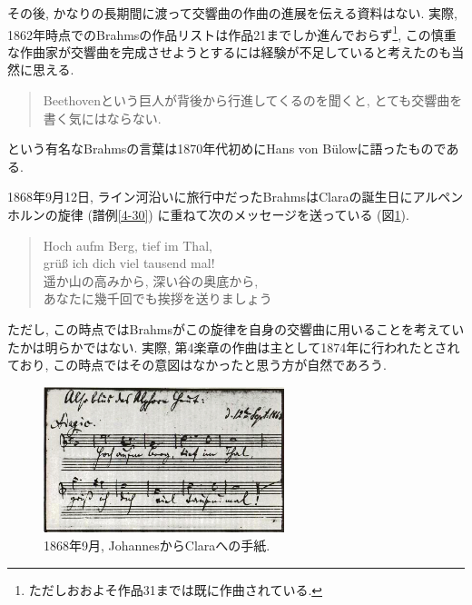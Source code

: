 その後, かなりの長期間に渡って交響曲の作曲の進展を伝える資料はない.
実際, 1862年時点でのBrahmsの作品リストは作品21までしか進んでおらず\footnote{ただしおおよそ作品31までは既に作曲されている.},
この慎重な作曲家が交響曲を完成させようとするには経験が不足していると考えたのも当然に思える.
\begin{quote}
	Beethovenという巨人が背後から行進してくるのを聞くと, とても交響曲を書く気にはならない.\cite{denki}
\end{quote}
という有名なBrahmsの言葉は1870年代初めにHans von Bülowに語ったものである\cite{library}.

1868年9月12日, ライン河沿いに旅行中だったBrahms\cite{compos}はClaraの誕生日にアルペンホルンの旋律
(譜例\ref{4-30}) に重ねて次のメッセージを送っている (図\ref{fig: alphorn}).
\begin{quote}
\begin{multicols}{2}
	Hoch aufm Berg, tief im Thal, \\
	grüß ich dich viel tausend mal! \\
	遥か山の高みから, 深い谷の奥底から, \\
	あなたに幾千回でも挨拶を送りましょう
\end{multicols}
\end{quote}
ただし, この時点ではBrahmsがこの旋律を自身の交響曲に用いることを考えていたかは明らかではない.
実際, 第4楽章の作曲は主として1874年に行われたとされており, この時点ではその意図はなかったと思う方が自然であろう\cite{frisch}.

\begin{figure}[htbp]
	\begin{center}
    \includegraphics[clip,width=7.0cm]{./figure/alphorn.jpg}
	\caption{1868年9月, JohannesからClaraへの手紙.}
    \label{fig: alphorn}
	\end{center}
\end{figure}

